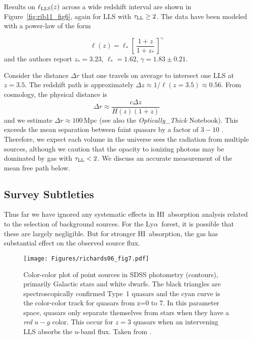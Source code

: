 \documentclass[graybox]{svmult}
\newcommand{\HI}{H{\sc I}}
\def\lya{Ly$\alpha$}
\def\ltk{\left [ \,}
\def\rtk{\, \right  ] }
\begin{document}
Results on $\ell_{\rm LLS}(z)$ across a wide redshift interval
are shown in Figure~\ref{fig:rib11_fig6}, again for
LLS with $\tau_{\rm LL} \ge 2$.
The data have been modeled with a 
power-law of the form

  	\begin{equation}
  	\ell(z) = \ell_* \ltk \frac{1+z}{1+z_*} \rtk^\gamma
  	\label{eqn:lz}
  	\end{equation}
and the authors report
$z_* = 3.23$, $\ell_* = 1.62$, $\gamma = 1.83 \pm 0.21$.

Consider the distance $\Delta r$ that one travels
on average to intersect one LLS at $z=3.5$.
The redshift path is approximately
$\Delta z \approx 1 / \ell(z=3.5) \approx 0.56$.
From cosmology,  the physical distance is
\begin{equation}
\Delta r \approx \frac{c \Delta z}{H(z) (1+z)}
\end{equation}
and we estimate $\Delta r \approx 100$\,Mpc
(see also the {\it Optically\_Thick} Notebook).
This exceeds the mean separation between faint
quasars by a factor of $3-10$ \cite{flz+09}.
Therefore, we expect each volume in the universe sees
the radiation from multiple sources, although we caution
that the opacity to ionizing photons may be dominated
by gas with $\tau_{\rm LL} <2$.  We discuss an 
accurate measurement of the mean free path below.

\subsection{Survey Subtleties}

Thus far we have ignored any systematic effects in \HI\
absorption analysis related to the selection of background
sources.  For the \lya\ forest, it is possible that these
are largely negligible.    But for stronger \HI\ absorption,
the gas has substantial effect on the observed source
flux.  

%
\begin{figure}[b]
\sidecaption
\texttt{[image: Figures/richards06\_fig7.pdf]}
%
%
\caption{Color-color plot of point sources in SDSS photometry
(contours), primarily Galactic stars and white dwarfs.
The black triangles are spectroscopically confirmed Type~1 quasars
and the cyan curve is the color-color track for quasars
from z=0 to 7.  In this parameter space, quasars only separate
themselves from stars when they have a {\it red} $u-g$ color.
This occur for $z=3$ quasars when an intervening LLS absorbs
the $u$-band flux.
Taken from \cite{RichardsSED06}.
}
\label{fig:stack_saw}       %
\end{figure}
\end{document}

